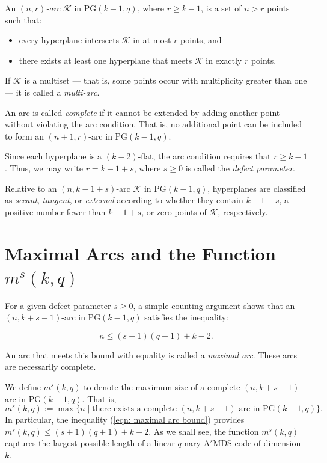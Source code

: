 \documentclass[letterpaper, 12pt]{article}
\newcommand{\K}{\mathcal{K}}
\begin{document}
An \emph{\((n, r)\)-arc} \( \K \) in PG\((k - 1, q)\), where \( r \ge k - 1 \), is a set of \( n>r \) points such that:
\begin{itemize}
	\item every hyperplane intersects \( \K \) in at most \( r \) points, and
	\item there exists at least one hyperplane that meets \( \K \) in exactly \( r \) points.
\end{itemize}

If \( \K \) is a multiset — that is, some points occur with multiplicity greater than one — it is called a \emph{multi-arc}.

An arc is called \emph{complete} if it cannot be extended by adding another point without violating the arc condition. That is, no additional point can be included to form an \((n+1, r)\)-arc in PG\((k - 1, q)\).

Since each hyperplane is a \( (k - 2) \)-flat, the arc condition requires that \( r \ge k - 1 \). Thus, we may write \( r = k - 1 + s \), where \( s \ge 0 \) is called the \emph{defect parameter}.

Relative to an $(n, k-1+s)$-arc $\mathcal{K}$  in $\mathrm{PG}(k-1,q)$, hyperplanes are classified as \emph{secant}, \emph{tangent}, or \emph{external} according to whether they contain $k-1+s$, a positive number fewer than $k-1+s$, or zero points of $\mathcal{K}$, respectively.


\section*{Maximal Arcs and the Function \( m^s(k, q) \)}

For a given defect parameter \( s \ge 0 \), a simple counting argument  shows that an \((n, k + s - 1)\)-arc in PG\((k - 1, q)\) satisfies the inequality:
 
\begin{equation} \label{eqn: maximal arc bound}
	n \le (s+1)(q+1) + k - 2.
\end{equation}
 
An arc that meets this bound with equality is called a \emph{maximal arc}. These arcs are necessarily complete.

We define \( m^s(k, q) \) to denote the maximum size of a complete \((n, k + s - 1)\)-arc in PG\((k - 1, q)\). That is,
\[
m^s(k, q) := \max \{ n \mid \text{there exists a complete } (n, k + s - 1)\text{-arc in PG}(k - 1, q) \}.
\]
In particular, the inequality (\ref{eqn: maximal arc bound}) provides $m^s(k,q)\le (s+1)(q+1)+k-2$. 
As we shall see, the function $m^s(k,q)$ captures the largest possible length of a linear $q$-nary A$^s$MDS code of dimension $k$.
\end{document}

